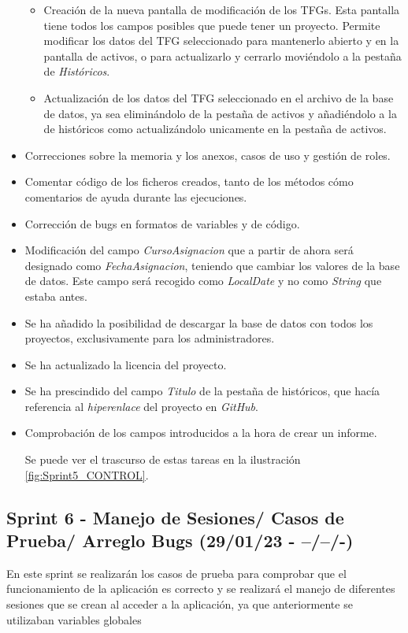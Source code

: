 \begin{itemize}
\begin{itemize}
		\item Creación de la nueva pantalla de modificación de los TFGs. Esta pantalla tiene todos los campos posibles que puede tener un proyecto. Permite modificar los datos del TFG seleccionado para mantenerlo abierto y en la pantalla de activos, o para actualizarlo y cerrarlo moviéndolo a la pestaña de \emph{Históricos}.
		\item Actualización de los datos del TFG seleccionado en el archivo de la base de datos, ya sea eliminándolo de la pestaña de activos y añadiéndolo a la de históricos como actualizándolo unicamente en la pestaña de activos.
	\end{itemize}
	\item Correcciones sobre la memoria y los anexos, casos de uso y gestión de roles.
	\item Comentar código de los ficheros creados, tanto de los métodos cómo comentarios de ayuda durante las ejecuciones.
	\item Corrección de bugs en formatos de variables y de código.
	\item Modificación del campo \emph{CursoAsignacion} que a partir de ahora será designado como \emph{FechaAsignacion}, teniendo que cambiar los valores de la base de datos. Este campo será recogido como \emph{LocalDate} y no como \emph{String} que estaba antes.
	\item Se ha añadido la posibilidad de descargar la base de datos con todos los proyectos, exclusivamente para los administradores.
	\item Se ha actualizado la licencia del proyecto.
	\item Se ha prescindido del campo \emph{Titulo} de la pestaña de históricos, que hacía referencia al \emph{hiperenlace} del proyecto en  \emph{GitHub}.
	\item Comprobación de los campos introducidos a la hora de crear un informe. 
	
	Se puede ver el trascurso de estas tareas en la ilustración \ref{fig:Sprint5_CONTROL}.
	
\end{itemize}

\subsection{Sprint 6 - Manejo de Sesiones/ Casos de Prueba/ Arreglo Bugs (29/01/23 - --/--/-) }

En este sprint se realizarán los casos de prueba para comprobar que el funcionamiento de la aplicación es correcto y se realizará el manejo de diferentes sesiones que se crean al acceder a la aplicación, ya que anteriormente se utilizaban variables globales


